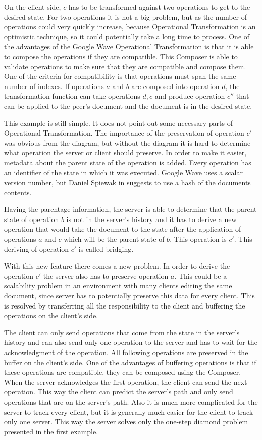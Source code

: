 \documentclass[12pt,oneside]{fithesis2}
\begin{document}
\par On the client side, \(c\) has to be transformed against two operations to get to the desired state. For two operations it is not a big problem, but as the number of operations could very quickly increase, because Operational Transformation is an optimistic technique, so it could potentially take a long time to process. One of the advantages of the Google Wave Operational Transformation is that it is able to compose the operations if they are compatible. This Composer is able to validate operations to make sure that they are compatible and compose them. One of the criteria for compatibility is that operations must span the same number of indexes.  If operations \(a\) and \(b\) are composed into operation \(d\), the transformation function can take operations \(d,c\) and produce operation \(c''\) that can be applied to the peer's document and the document is in the desired state. 
\par This example is still simple. It does not point out some necessary parts of Operational Transformation. The importance of the preservation of operation \(c'\) was obvious from the diagram, but without the diagram it is hard to determine what operation the server or client should preserve. In order to make it easier, metadata about the parent state of the operation is added. Every operation has an identifier of the state in which it was executed. Google Wave uses a scalar version number, but Daniel Spiewak in \cite{Spiewak} suggests to use a hash of the documents contents. 
\par Having the parentage information, the server is able to determine that the parent state of operation \(b\) is not in the server's history and it has to derive a new operation that would take the document to the state after the application of operations \(a\) and \(c\) which will be the parent state of \(b\). This operation is \(c'\). This deriving of operation \(c'\) is called bridging.
\par With this new feature there comes a new problem. In order to derive the operation \(c'\) the server also has to preserve operation \(a\). This could be a scalability problem in an environment with many clients editing the same document, since server has to potentially preserve this data for every client. This is resolved by transferring all the responsibility to the client and buffering the operations on the client's side. 
\par The client can only send operations that come from the state in the server's history and can also send only one operation to the server and has to wait for the acknowledgment of the operation. All following operations are preserved in the buffer on the client's side. One of the advantages of buffering operations is that if these operations are compatible, they can be composed using the Composer. When the server acknowledges the first operation, the client can send the next operation. This way the client can predict the server's path and only send operations that are on the server's path. Also it is much more complicated for the server to track every client, but it is generally much easier for the client to track only one server. This way the server solves only the one-step diamond problem presented in the first example.
\end{document}
